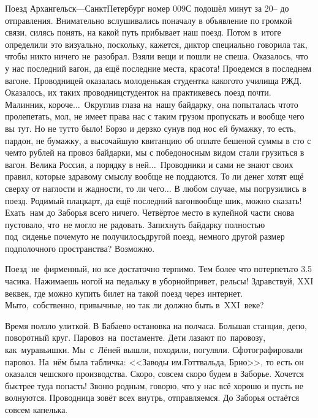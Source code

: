 Поезд Архангельск\thinspace\nobreakdash---\thinspace Санкт\sdash Петербург номер 009С подошёл минут за 20\thinspace\nobreakdash-- до отправления. Внимательно вслушивались поначалу в объявление по громкой связи, силясь понять, на какой путь прибывает наш поезд. Потом в~итоге определили это визуально, поскольку, кажется, диктор специально говорила так, чтобы никто ничего не~разобрал. Взяли вещи и пошли не спеша. Оказалось, что у нас последний вагон, да ещё последние места, красота! Проедемся в последнем вагоне. Проводницей оказалась молоденькая студентка какого\sdash то училища РЖД. Оказалось, их таких проводниц\sdash студенток на практике\mdash весь поезд почти. Малинник, короче$\ldots$~Округлив глаза на~нашу байдарку, она попыталась что\sdash то пролепетать, мол, не имеет права нас с таким грузом пропускать и вообще чего вы тут. Но не тут\sdash то было! Борзо и дерзко сунув под нос ей бумажку, то есть, пардон, не бумажку, а высочайшую квитанцию об оплате бешеной суммы в сто с чем\sdash то рублей на провоз байдарки, мы с победоносным видом стали грузиться в вагон. Велика Россия, а порядку в ней$\ldots$~Проводники и сами не знают своих правил, которые здравому смыслу вообще не поддаются. То ли денег хотят ещё сверху от наглости и жадности, то ли чего$\ldots$
\newpage
В любом случае, мы погрузились в поезд. Родимый плацкарт, да ещё последний вагон\mdash вообще шик, можно сказать! Ехать~нам до Заборья всего ничего. Четвёртое место в купейной части снова пустовало, что~не могло не радовать. Запихнуть байдарку полностью под~сиденье почему\sdash то не получилось\mdash другой поезд, немного другой размер подполочного пространства? Возможно. 

Поезд~не~фирменный, но все достаточно терпимо. Тем более что потерпеть\sdash то 3.5 часика. Нажимаешь ногой на педальку в уборной\mdash привет, рельсы! Здравствуй, XXI век\mdash век, где можно купить билет на такой поезд через интернет. Мы\sdash то,~собственно, привычные, но так ли должно быть в~XXI~веке?

Время ползло улиткой. В Бабаево остановка на полчаса. Большая станция, депо, поворотный круг. Паровоз~на~постаменте. Дети лазают по~паровозу, как~муравьишки. Мы~с~Лёней вышли, походили, погуляли. Сфотографировали паровоз. На~нём была табличка: <<Заводы им.\thinspace Готтвальда, Брно>>, то есть он оказался чешского производства. Скоро, совсем скоро будем в Заборье. Хочется быстрее туда попасть! Звоню родным, говорю, что у нас всё хорошо и пусть не волнуются. Проводница зовёт всех внутрь, отправляемся. До Заборья остаётся совсем капелька.

